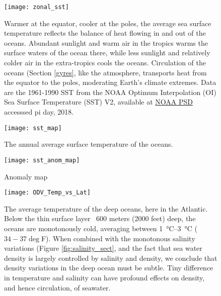 {\newpage
\begin{figure}[p]
\centering
  \texttt{[image: zonal\_sst]}%
\caption{Warmer at the equator, cooler at the poles, the average sea surface temperature reflects the balance of heat flowing in and out of the oceans. Abundant sunlight and warm air in the tropics warms the surface waters of the ocean there, while less sunlight and relatively colder air in the extra-tropics cools the oceans. Circulation of the oceans (Section \ref{gyres}, like the atmosphere, transports heat from the equator to the poles, moderating Earth's climate extremes. Data are the 1961-1990 SST from the NOAA Optimum Interpolation (OI) Sea Surface Temperature (SST) V2, available at \href{https://www.esrl.noaa.gov/psd/data/gridded/data.noaa.oisst.v2.html}{NOAA PSD} accesssed pi day, 2018.}
\label{fig:zonal_sst}
\end{figure}

\newpage
\begin{figure}[p]
\centering
  \texttt{[image: sst\_map]}%
\caption{The annual average surface temperature of the oceans.}
\label{fig:sst_map}
\end{figure}


\begin{figure}[p]
\centering
  \texttt{[image: sst\_anom\_map]}%
\caption{Anomaly map}
\label{fig:sst_anom_map}
\end{figure}



\newpage
\begin{figure}[p]
\centering
  \texttt{[image: ODV\_Temp\_vs\_Lat]}%
\caption{The average temperature of the deep oceans, here in the Atlantic. Below the thin surface layer ~600 meters (2000 feet) deep, the oceans are monotonously cold, averaging between \SIrange{1}{3}{\celsius} ($34-37 \deg$F). When combined with the monotonous salinity variations (Figure \ref{fig:salinity_sect}, and the fact that sea water density is largely controlled by salinity and density, we conclude that density variations in the deep ocean must be subtle. Tiny difference in temperature and salinity can have profound effects on density, and hence circulation, of seawater.}
\label{fig:ODV_Temp_vs_Lat}
\end{figure}

}
